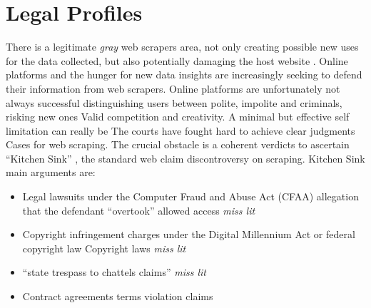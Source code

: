 \documentclass[
  12pt,
  a4paper,
  oneside]{book}
\providecommand{\tightlist}{%
  \setlength{\itemsep}{0pt}\setlength{\parskip}{0pt}}
\theoremstyle{definition}
\theoremstyle{definition}
\theoremstyle{definition}
\theoremstyle{remark}
\begin{document}
\hypertarget{legal}{%
\section{Legal Profiles}\label{legal}}

There is a legitimate \emph{gray} web scrapers area, not only creating possible new uses for the data collected, but also potentially damaging the host website \citep{WhatCour57}. Online platforms and the hunger for new data insights are increasingly seeking to defend their information from web scrapers. Online platforms are unfortunately not always successful distinguishing users between polite, impolite and criminals, risking new ones Valid competition and creativity. A minimal but effective self limitation can really be
The courts have fought hard to achieve clear judgments Cases for web scraping. The crucial obstacle is a coherent verdicts to ascertain ``Kitchen Sink'' \citep{Kitchens81}, the standard web claim discontroversy on scraping. Kitchen Sink main arguments are:

\begin{itemize}
\tightlist
\item
  Legal lawsuits under the Computer Fraud and Abuse Act (CFAA) allegation that the defendant ``overtook'' allowed access \emph{miss lit}
\item
  Copyright infringement charges under the Digital Millennium Act or federal copyright law Copyright laws \emph{miss lit}
\item
  ``state trespass to chattels claims'' \emph{miss lit}
\item
  Contract agreements terms violation claims
\end{itemize}
\end{document}
